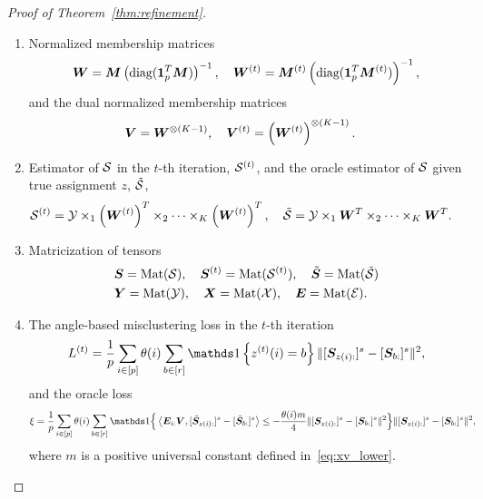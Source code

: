 \documentclass[lettersize,onecolumn,journal]{IEEEtran}
\theoremstyle{definition}
\theoremstyle{definition}
\newcommand{\of}[1]{\left(#1\right)}
\newcommand{\offf}[1]{\left\{#1\right\}}
\newcommand{\ang}[1]{\left\langle#1\right\rangle}
\def\fixme#1#2{\textbf{\color{red}[FIXME (#1): #2]}}
\begin{document}
\begin{proof}[Proof of Theorem~\ref{thm:refinement}]
\begin{enumerate}
    \item Normalized membership matrices
    \begin{align}
        \mW = \mM \of{ \text{diag}(\mone_{p}^T \mM) }^{-1}, \quad \mW^{(t)} = \mM^{(t)} \of{ \text{diag}(\mone_{p}^T \mM^{(t)}) }^{-1},
    \end{align}
    and the dual normalized membership matrices
    \begin{align}
         \mV &= \mW^{\otimes (K-1)}, \quad \mV^{(t)} =\of{ \mW^{(t)}}^{\otimes (K-1)}.
    \end{align}
    \item Estimator of $\mathcal{S}$ in the $t$-th iteration, $\mathcal{S}^{(t)}$, and the oracle estimator of $\mathcal{S}$ given true assignment $z$, $\tilde {\mathcal{S}}$,
    \begin{align}
        \tS^{(t)} = \tY \times_1 \of{\mW^{(t)}}^T \times_2 \cdots \times_K \of{\mW^{(t)}}^T, \quad \tilde \tS &= \tY \times_1 \mW^T \times_2 \cdots \times_K \mW^T.
    \end{align}
    \item Matricization of tensors
    \begin{align}
        &\bm S = \text{Mat}(\mathcal{S}), \quad \bm S^{(t)} = \text{Mat}(\mathcal{S}^{(t)}), \quad \tilde {\bm S} = \text{Mat}(\tilde {\mathcal{S}})\\
        &\bm Y = \text{Mat}(\mathcal{Y}), \quad \bm X = \text{Mat}(\mathcal{X}), \quad \bm{E} = \text{Mat}(\mathcal{E}).
    \end{align}
    \item The angle-based misclustering loss in the $t$-th iteration %
    \begin{equation}
         L^{(t)} = \frac{1}{p}  \sum_{i \in [p]} \theta(i) \sum_{b \in [r]}  \ind \offf{ z^{(t)}(i) = b } \onormSize{}{ [ \mS_{ z(i):}  ]^s - [ \mS_{b:}  ]^s  }^2,
    \end{equation}
     and the oracle loss
    \begin{align}
         \xi & = \frac{1}{p} \sum_{i \in [p]} \theta(i) \sum_{b \in [r]} \ind \Big\{\ang{ \mE_{i:} \mV, [  \tilde \mS_{z(i):} ]^s - [  \tilde \mS_{b:} ]^s}  \leq - \frac{ \theta(i) m}{4} \onormSize{}{ [ \mS_{z(i):}  ]^s - [ \mS_{b:}  ]^s  }^2 \Big\} \onormSize{}{ [ \mS_{z(i):}  ]^s - [ \mS_{ b:}  ]^s  }^2,
    \end{align}
    where $m$ is a positive universal constant defined in~\eqref{eq:xv_lower}.
\end{enumerate}


\end{proof}
\end{document}
